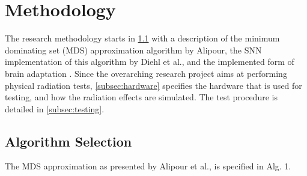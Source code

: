 \section{Methodology}\label{sec:methodology}
The research methodology starts in \cref{subsec:algorithm} with a description of the minimum dominating set (MDS) approximation algorithm by Alipour, the SNN implementation of this algorithm by Diehl et al., and the implemented form %
of brain adaptation \cite{alipour2020distributed}\cite{diehl}. Since the overarching research project aims at performing physical radiation tests, \cref{subsec:hardware} specifies the hardware that is used for testing, and how the radiation effects are simulated. The test procedure is detailed in \cref{subsec:testing}.

\subsection{Algorithm Selection}\label{subsec:algorithm}
The MDS approximation as presented by Alipour et al., is specified in Alg. 1.
